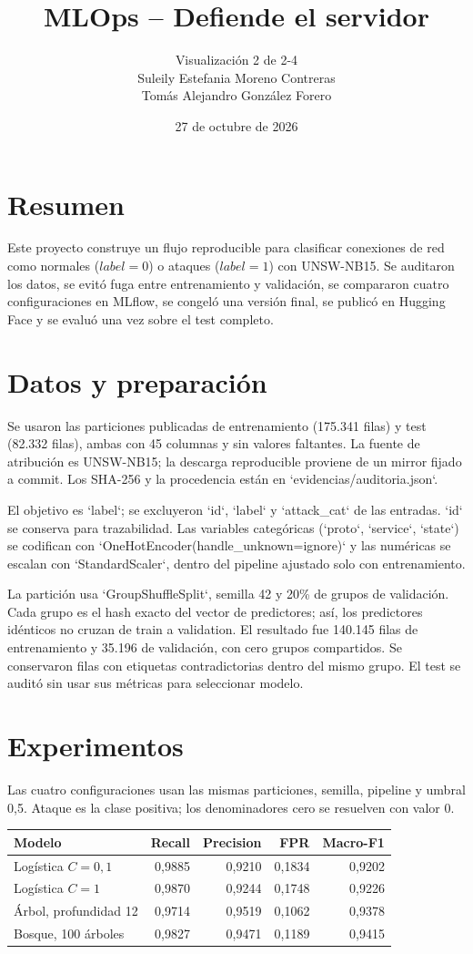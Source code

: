 \documentclass[10pt,a4paper]{article}
\title{\vspace{-1.2cm}\color{azul}\textbf{MLOps -- Defiende el servidor}}
\author{Visualización 2 de 2-4\\Suleily Estefania Moreno Contreras\\Tomás Alejandro González Forero}
\date{27 de octubre de 2026}
\begin{document}
\maketitle\vspace{-8pt}
\section*{Resumen}
Este proyecto construye un flujo reproducible para clasificar conexiones de red como normales ($label=0$) o ataques ($label=1$) con UNSW-NB15. Se auditaron los datos, se evitó fuga entre entrenamiento y validación, se compararon cuatro configuraciones en MLflow, se congeló una versión final, se publicó en Hugging Face y se evaluó una vez sobre el test completo.

\section{Datos y preparación}
Se usaron las particiones publicadas de entrenamiento (175.341 filas) y test (82.332 filas), ambas con 45 columnas y sin valores faltantes. La fuente de atribución es UNSW-NB15; la descarga reproducible proviene de un mirror fijado a commit. Los SHA-256 y la procedencia están en `evidencias/auditoria.json`.

El objetivo es `label`; se excluyeron `id`, `label` y `attack\_cat` de las entradas. `id` se conserva para trazabilidad. Las variables categóricas (`proto`, `service`, `state`) se codifican con `OneHotEncoder(handle\_unknown=ignore)` y las numéricas se escalan con `StandardScaler`, dentro del pipeline ajustado solo con entrenamiento.

La partición usa `GroupShuffleSplit`, semilla 42 y 20\% de grupos de validación. Cada grupo es el hash exacto del vector de predictores; así, los predictores idénticos no cruzan de train a validation. El resultado fue 140.145 filas de entrenamiento y 35.196 de validación, con cero grupos compartidos. Se conservaron filas con etiquetas contradictorias dentro del mismo grupo. El test se auditó sin usar sus métricas para seleccionar modelo.

\section{Experimentos}
Las cuatro configuraciones usan las mismas particiones, semilla, pipeline y umbral 0,5. Ataque es la clase positiva; los denominadores cero se resuelven con valor 0.

\begin{center}\small
\begin{tabularx}{\linewidth}{lrrrr}
\toprule
Modelo & Recall & Precision & FPR & Macro-F1\\
\midrule
Logística $C=0,1$ & 0,9885 & 0,9210 & 0,1834 & 0,9202\\
Logística $C=1$ & 0,9870 & 0,9244 & 0,1748 & 0,9226\\
Árbol, profundidad 12 & 0,9714 & 0,9519 & 0,1062 & 0,9378\\
Bosque, 100 árboles & 0,9827 & 0,9471 & 0,1189 & 0,9415\\
\bottomrule
\end{tabularx}\end{center}
\end{document}
